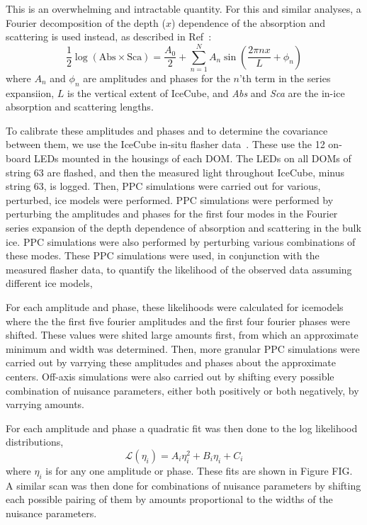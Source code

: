 \documentclass[main.tex]{subfiles}
\begin{document}
This is an overwhelming and intractable quantity. 
For this and similar analyses, a Fourier decomposition of the depth ($x$) dependence of the absorption and scattering is used instead, as described in Ref~\cite{Aartsen_2019_snow}: 
\begin{equation}
    \dfrac{1}{2}\log\left(\text{Abs} \times \text{Sca}\right) = \dfrac{A_{0}}{2} +\sum\limits_{n=1}^{N}A_{n} \sin\left(\dfrac{2\pi nx}{L} + \phi_{n}\right)
\end{equation}
where $A_{n}$ and $\phi_{n}$ are amplitudes and phases for the $n$'th term in the series expansiion, $L$ is the vertical extent of IceCube, and \textit{Abs} and \textit{Sca} are the in-ice absorption and scattering lengths. 


To calibrate these amplitudes and phases and to determine the covariance between them, we use the IceCube in-situ flasher data~\cite{Aartsen_2013}. 
These use the 12 on-board LEDs mounted in the housings of each DOM. 
The LEDs on all DOMs of string 63 are flashed, and then the measured light throughout IceCube, minus string 63, is logged. 
Then, PPC simulations were carried out for various, perturbed, ice models were performed. 
PPC simulations were performed by perturbing the amplitudes and phases for the first four modes in the Fourier series expansion of the depth dependence of absorption and scattering in the bulk ice.
PPC simulations were also performed by perturbing various combinations of these modes. 
These PPC simulations were used, in conjunction with the measured flasher data, to quantify the likelihood of the observed data assuming different ice models,

For each amplitude and phase, these likelihoods were calculated for icemodels where the the first five fourier amplitudes and the first four fourier phases were shifted. 
These values were shited large amounts first, from which an approximate minimum and width was determined. 
Then, more granular PPC simulations were carried out by varrying these amplitudes and phases about the approximate centers. 
Off-axis simulations were also carried out by shifting every possible combination of nuisance parameters, either both positively or both negatively, by varrying amounts. 


For each amplitude and phase a quadratic fit was then done to the log likelihood distributions, 
\begin{equation}
    \mathcal{L}(\eta_{i}) = A_{i}\eta_{i}^{2} + B_{i}\eta_{i} + C_{i}
\end{equation}
where $\eta_{i}$ is for any one amplitude or phase. These fits are shown in Figure FIG. 
A similar scan was then done for combinations of nuisance parameters by shifting each possible pairing of them by amounts proportional to the widths of the nuisance parameters. 
\end{document}
